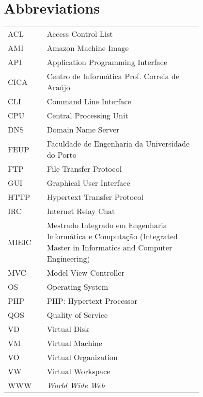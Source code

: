 \chapter*{Abbreviations}\label{chap:abbrev}

\begin{flushleft}
\begin{tabular}{l p{0.8\linewidth}}
ACL	 & Access Control List\\
AMI	 & Amazon Machine Image\\
API	 & Application Programming Interface\\
CICA	 & Centro de Informática Prof. Correia de Araújo\\
CLI	 & Command Line Interface\\
CPU	 & Central Processing Unit\\
DNS	 & Domain Name Server\\
FEUP	 & Faculdade de Engenharia da Universidade do Porto\\
FTP	 & File Transfer Protocol\\
GUI	 & Graphical User Interface\\
HTTP	 & Hypertext Transfer Protocol\\
IRC	 & Internet Relay Chat\\
MIEIC	 & Mestrado Integrado em Engenharia Informática e Computação (Integrated Master in Informatics and Computer Engineering)\\
MVC	 & Model-View-Controller\\
OS	 & Operating System\\
PHP	 & PHP: Hypertext Processor\\
QOS	 & Quality of Service\\
VD	 & Virtual Disk\\
VM	 & Virtual Machine\\
VO	 & Virtual Organization\\
VW	 & Virtual Workspace\\
WWW      & \emph{World Wide Web}
\end{tabular}
\end{flushleft}

